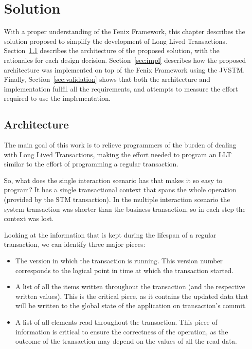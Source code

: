 \documentclass{llncs}
\begin{document}

\section{Solution}
\label{chap:solution}

With a proper understanding of the Fenix Framework, this chapter
describes the solution proposed to simplify the development of Long
Lived Transactions. Section~\ref{sec:arch} describes the architecture
of the proposed solution, with the rationales for each design
decision. Section~\ref{sec:impl} describes how the proposed
architecture was implemented on top of the Fenix Framework using the
JVSTM. Finally, Section~\ref{sec:validation} shows that both the
architecture and implementation fullfil all the requirements, and
attempts to measure the effort required to use the implementation.

\subsection{Architecture}
\label{sec:arch}

The main goal of this work is to relieve programmers of the burden of
dealing with Long Lived Transactions, making the effort needed to
program an LLT similar to the effort of programming a regular
transaction.

So, what does the single interaction scenario has that makes it so
easy to program? It has a single transactional context that spans the
whole operation (provided by the STM transaction). In the multiple
interaction scenario the system transaction was shorter than the
business transaction, so in each step the context was lost.

Looking at the information that is kept during the lifespan of a
regular transaction, we can identify three major pieces:

\begin{itemize}
\item The version in which the transaction is running. This version
  number corresponds to the logical point in time at which the
  transaction started.
\item A list of all the items written throughout the transaction (and
  the respective written values). This is the critical piece, as it
  contains the updated data that will be written to the global state
  of the application on transaction's commit.
\item A list of all elements read throughout the transaction. This
  piece of information is critical to ensure the correctness of the
  operation, as the outcome of the transaction may depend on the
  values of all the read data.
\end{itemize}
\end{document}

